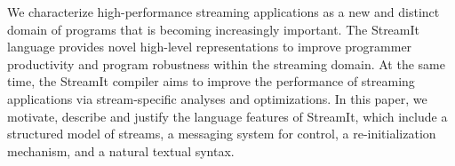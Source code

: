 We characterize high-performance streaming applications as a new and
distinct domain of programs that is becoming increasingly important.
The StreamIt language provides novel high-level representations to
improve programmer productivity and program robustness within the
streaming domain.  At the same time, the StreamIt compiler aims to
improve the performance of streaming applications via stream-specific
analyses and optimizations.  In this paper, we motivate, describe and
justify the language features of StreamIt, which include a structured
model of streams, a messaging system for control, a re-initialization
mechanism, and a natural textual syntax.

